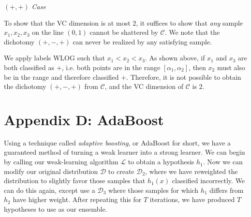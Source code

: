 \documentclass{article}
\newcommand{\LL}{\ensuremath{\mathcal{L}}}
\begin{document}
\begin{center}
\emph{$(+, +)$ Case}

\end{center}

To show that the VC dimension is at most $2$, it suffices to show that
\emph{any} sample $x_1, x_2, x_3$ on the line $(0, 1)$ cannot be shattered by
$\mathcal{C}$. We note that the dichotomy $(+, -, +)$ can never be realized by
any satisfying sample.\\

\begin{center}
\end{center}

We apply labels WLOG such that $x_1 < x_2 < x_3$. As shown above, if $x_1$ and
$x_3$ are both classified as $+$, i.e. both points are in the range
$[\alpha_1, \alpha_2]$, then $x_2$ must also be in the range and therefore
classified $+$. Therefore, it is not possible to obtain the dichotomy
$(+, -, +)$ from $\mathcal{C}$, and the VC dimension of $\mathcal{C}$ is $2$.

\section{Appendix D: AdaBoost}
Using a technique called \emph{adaptive boosting}, or AdaBoost for short, we
have a guaranteed method of turning a weak learner into a strong learner. We
can begin by calling our weak-learning algorithm $\LL$ to obtain a hypothesis
$h_1$. Now we can modify our original distribution $\mathcal{D}$ to create
$\mathcal{D}_2$, where we have reweighted the distribution to slightly favor
those samples that $h_1(x)$ classified incorrectly. We can do this again,
except use a $\mathcal{D}_3$ where those samples for which $h_1$ differs from
$h_2$ have higher weight. After repeating this for $T$ iterations, we have
produced $T$ hypotheses to use as our ensemble.
\end{document}
